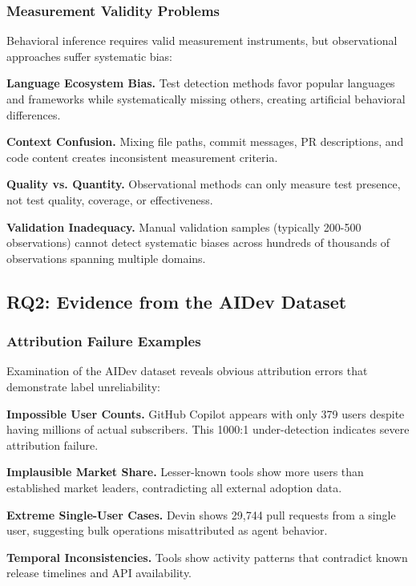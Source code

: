 \documentclass[conference]{IEEEtran}
\begin{document}
\subsubsection{Measurement Validity Problems}

Behavioral inference requires valid measurement instruments, but observational approaches suffer systematic bias:

\textbf{Language Ecosystem Bias.} Test detection methods favor popular languages and frameworks while systematically missing others, creating artificial behavioral differences.

\textbf{Context Confusion.} Mixing file paths, commit messages, PR descriptions, and code content creates inconsistent measurement criteria.

\textbf{Quality vs. Quantity.} Observational methods can only measure test presence, not test quality, coverage, or effectiveness.

\textbf{Validation Inadequacy.} Manual validation samples (typically 200-500 observations) cannot detect systematic biases across hundreds of thousands of observations spanning multiple domains.

\subsection{RQ2: Evidence from the AIDev Dataset}

\subsubsection{Attribution Failure Examples}

Examination of the AIDev dataset reveals obvious attribution errors that demonstrate label unreliability:

\textbf{Impossible User Counts.} GitHub Copilot appears with only 379 users despite having millions of actual subscribers. This 1000:1 under-detection indicates severe attribution failure.

\textbf{Implausible Market Share.} Lesser-known tools show more users than established market leaders, contradicting all external adoption data.

\textbf{Extreme Single-User Cases.} Devin shows 29,744 pull requests from a single user, suggesting bulk operations misattributed as agent behavior.

\textbf{Temporal Inconsistencies.} Tools show activity patterns that contradict known release timelines and API availability.
\end{document}
